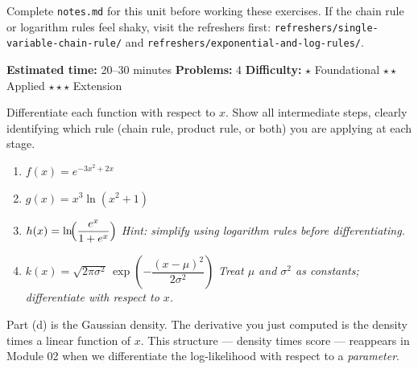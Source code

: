 \documentclass[11pt, letterpaper]{article}
\begin{document}

\maketitleblock

\begin{tcolorbox}[
  colback=ts-light,
  colframe=ts-gray,
  title=Before You Begin,
  fonttitle=\bfseries
]
Complete \texttt{notes.md} for this unit before working these exercises.
If the chain rule or logarithm rules feel shaky, visit the refreshers first:
\texttt{refreshers/single-variable-chain-rule/} and
\texttt{refreshers/exponential-and-log-rules/}.

\medskip
\textbf{Estimated time:} 20--30 minutes \quad
\textbf{Problems:} 4 \quad
\textbf{Difficulty:}
$\star$ Foundational \enspace
$\star\star$ Applied \enspace
$\star\star\star$ Extension
\end{tcolorbox}

\vspace{16pt}


\begin{problembox}[title={Problem 1 \hfill $\star$}]
Differentiate each function with respect to $x$. Show all intermediate steps,
clearly identifying which rule (chain rule, product rule, or both) you are
applying at each stage.
\end{problembox}

\begin{enumerate}
  \item $f(x) = e^{-3x^2 + 2x}$

  \item $g(x) = x^3 \ln(x^2 + 1)$

  \item $h(x) = \ln\!\Bigl(\dfrac{e^x}{1 + e^x}\Bigr)$
  \quad \textit{Hint: simplify using logarithm rules before differentiating.}

  \item $k(x) = \sqrt{2\pi\sigma^2}\,\exp\!\left(-\dfrac{(x - \mu)^2}{2\sigma^2}\right)$
  \quad \textit{Treat $\mu$ and $\sigma^2$ as constants; differentiate with respect to $x$.}
\end{enumerate}

\vspace{20pt}

\begin{warningbox}
Part (d) is the Gaussian density. The derivative you just computed is the
density times a linear function of $x$. This structure — density times score
— reappears in Module 02 when we differentiate the log-likelihood with respect
to a \emph{parameter}.
\end{warningbox}
\end{document}
